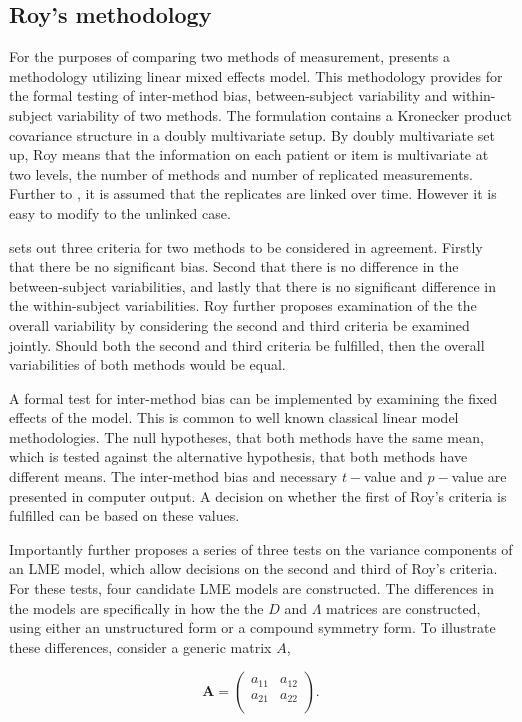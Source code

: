 \documentclass[12pt, a4paper]{report}
\theoremstyle{plain}
\theoremstyle{definition}
\theoremstyle{remark}
\begin{document}
\subsection{Roy's methodology}

For the purposes of comparing two methods of measurement, \citet{roy} presents a methodology utilizing linear mixed effects model. This methodology provides for the formal testing of inter-method bias, between-subject variability and within-subject variability of two methods. The formulation contains a Kronecker product covariance structure in a doubly multivariate setup. By doubly multivariate set up, Roy means that the information on each patient or item is multivariate at two levels, the number of methods and number of replicated measurements. Further to \citet{lam}, it is assumed that the replicates are linked over time. However it is easy to modify to the unlinked case.

\citet{roy} sets out three criteria for two methods to be considered in agreement. Firstly that there be no significant bias. Second that there is no difference in the between-subject variabilities, and lastly that there is no significant difference in the within-subject variabilities. Roy further proposes examination of the the overall variability by considering the second and third criteria be examined jointly. Should both the second and third criteria be fulfilled, then the overall variabilities of both methods would be equal.

A formal test for inter-method bias can be implemented by examining the fixed effects of the model. This is common to well known classical linear model methodologies. The null hypotheses, that both methods have the same mean, which is tested against the alternative hypothesis, that both methods have different means.
The inter-method bias and necessary $t-$value and $p-$value are presented in computer output. A decision on whether the first of Roy's criteria is fulfilled can be based on these values.

Importantly \citet{roy} further proposes a series of three tests on the variance components of an LME model, which allow decisions on the second and third of Roy's criteria. For these tests, four candidate LME models are constructed. The differences in the models are specifically in how the the $D$ and $\Lambda$ matrices are constructed, using either an unstructured form or a compound symmetry form. To illustrate these differences, consider a generic matrix $A$,

\[
\boldsymbol{A} = \left( \begin{array}{cc}
    a_{11} & a_{12}  \\
    a_{21} & a_{22}  \\
    \end{array}\right).
\]
\end{document}
